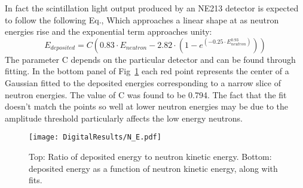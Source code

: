 \documentclass[main.tex]{subfiles}
\begin{document}
In fact the scintillation light output produced by an NE213 detector is expected to follow the following Eq.\cite{Scherzinger:2016}, Which approaches a linear shape at as neutron energies rise and the exponential term approaches unity:
\begin{equation}
	E_{deposited} = C\left(  0.83\cdot E_{neutron} - 2.82\cdot\left(  1 - e^{(-0.25\cdot E_{neutron}^{0.93})}  \right)  \right)
\end{equation}
The parameter C depends on the particular detector and can be found through fitting. In the bottom panel of Fig~\ref{fig:N_E} each red point represents the center of a Gaussian fitted to the deposited energies corresponding to a narrow slice of neutron energies. The value of C was found to be 0.794. The fact that the fit doesn't match the points so well at lower neutron energies may be due to the amplitude threshold particularly affects the low energy neutrons.

\begin{figure}[ht]
    \centering
        \texttt{[image: DigitalResults/N\_E.pdf]}
        \caption[Neutron kinetic energy and deposited energy.]{Top: Ratio of deposited energy to neutron kinetic energy. Bottom: deposited energy as a function of neutron kinetic energy, along with fits.}
    \label{fig:N_E} 
\end{figure}
\end{document}
